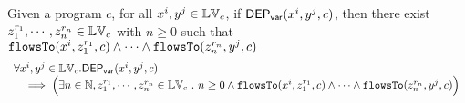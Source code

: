 %
\begin{thm}
\label{thm:flowsto_soundness}
Given a program ${c}$, for all  $ x^i, y^j \in \mathbb{LV}_{{c}}$, if $\mathsf{DEP_{var}}(x^i, y^j, {c})$,
then
there exist $z_1^{r_1}, \cdots, z_n^{r_n} \in \mathbb{LV}_{{c}}$ with $n \geq 0$ such that   
$\mathtt{flowsTo}(x^i,  z_1^{r_1}, c) 
\land \cdots \land \mathtt{flowsTo}(z_n^{r_n}, y^j, c)$
%
\[
\begin{array}{l}
  \forall x^i, y^j \in \mathbb{LV}_{{c}}.
  \mathsf{DEP_{var}}(x^i, y^j, {c})
  \\ \quad \implies
  \Big( \exists n \in \mathbb{N}, z_1^{r_1}, \cdots, z_n^{r_n} \in \mathbb{LV}_{{c}} ~.~ n \geq 0 \land
  \mathtt{flowsTo}(x^i,  z_1^{r_1}, c) 
  \land \cdots \land \mathtt{flowsTo}(z_n^{r_n}, y^j, c) \Big)
\end{array}
\]
\end{thm}
